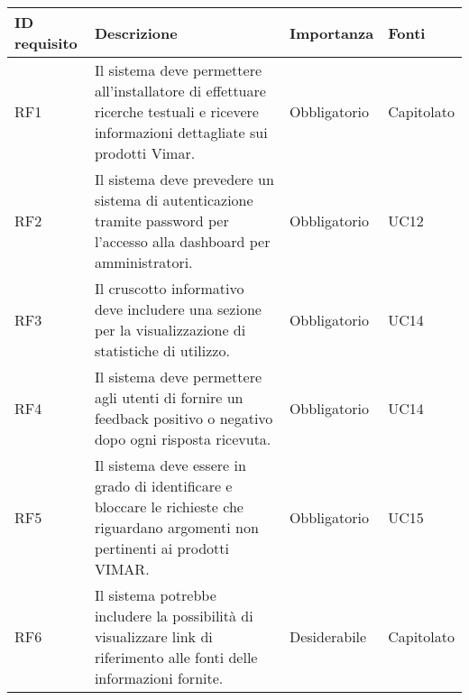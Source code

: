 \begin{table}[H]
    \begin{tabular}{|C{2.7cm}|L{7.2cm}|C{2.7cm}|C{2cm}|}
        \hline
        \textbf{ID requisito} & \textbf{Descrizione} & \textbf{Importanza} & \textbf{Fonti}  \\
        \hline
        RF1 & Il sistema deve permettere all'installatore di effettuare ricerche testuali e ricevere informazioni dettagliate sui prodotti Vimar. & Obbligatorio & Capitolato \\
        \hline
        RF2 & Il sistema deve prevedere un sistema di autenticazione tramite password per l'accesso alla dashboard per amministratori. & Obbligatorio & UC12 \\
        \hline
        RF3 & Il cruscotto informativo deve includere una sezione per la visualizzazione di statistiche di utilizzo. & Obbligatorio & UC14 \\
        \hline
        RF4 & Il sistema deve permettere agli utenti di fornire un feedback positivo o negativo dopo ogni risposta ricevuta. & Obbligatorio & UC14 \\
        \hline
        RF5 & Il sistema deve essere in grado di identificare e bloccare le richieste che riguardano argomenti non pertinenti ai prodotti VIMAR. & Obbligatorio & UC15 \\
        \hline
        RF6 & Il sistema potrebbe includere la possibilità di visualizzare link di riferimento alle fonti delle informazioni fornite. & Desiderabile & Capitolato \\
        \hline
        \end{tabular}

\end{table}